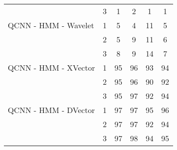 \documentclass[conference]{IEEEtran}
\begin{document}
\begin{table*}[htbp]
\begin{tabular}{|l|c|c|c|c|c|}
                             & 3             & 1                      & 2                       & 1                    & 1                      \\
        QCNN - HMM - Wavelet & 1             & 5                      & 4                       & 11                   & 5                      \\
                             & 2             & 5                      & 9                       & 11                   & 6                      \\
                             & 3             & 8                      & 9                       & 14                   & 7                      \\
        QCNN - HMM - XVector & 1             & 95                     & 96                      & 93                   & 94                     \\
                             & 2             & 95                     & 96                      & 90                   & 92                     \\
                             & 3             & 95                     & 97                      & 92                   & 94                     \\
        QCNN - HMM - DVector & 1             & 97                     & 97                      & 95                   & 96                     \\
                             & 2             & 97                     & 97                      & 92                   & 94                     \\
                             & 3             & 97                     & 98                      & 94                   & 95                     \\
        \hline
    \end{tabular}
\end{table*}






\end{document}

